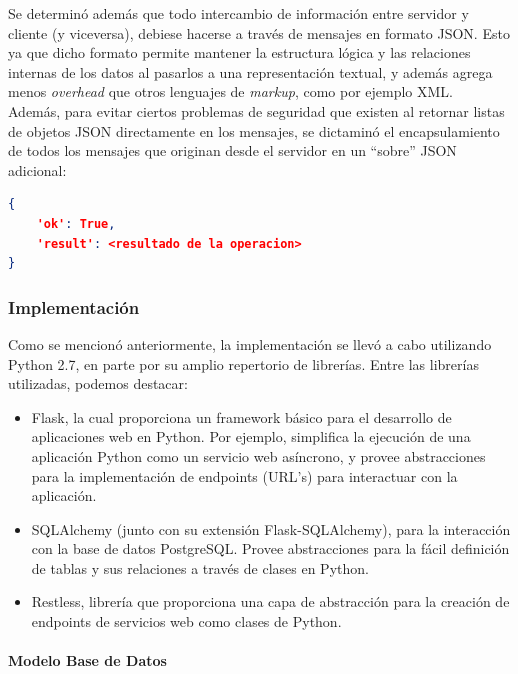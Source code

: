\documentclass[11pt,letterpaper]{article}
\begin{document}
Se determinó además que todo intercambio de información entre servidor y cliente (y viceversa), debiese hacerse a través de mensajes en formato JSON. Esto ya que dicho formato permite mantener la estructura lógica y las relaciones internas de los datos al pasarlos a una representación textual, y además agrega menos \emph{overhead} que otros lenguajes de \emph{markup}, como por ejemplo XML.\\

Además, para evitar ciertos problemas de seguridad que existen al retornar listas de objetos JSON directamente en los mensajes, se dictaminó el encapsulamiento de todos los mensajes que originan desde el servidor en un ``sobre'' JSON adicional:

\begin{lstlisting}[language=json, title=Ejemplo de ``sobre'' JSON.]
{
    'ok': True,
    'result': <resultado de la operacion>
}
\end{lstlisting}

\subsubsection{Implementación}

Como se mencionó anteriormente, la implementación se llevó a cabo utilizando Python 2.7, en parte por su amplio repertorio de librerías. Entre las librerías utilizadas, podemos destacar:
\begin{itemize}
    \item Flask\cite{flask}, la cual proporciona un framework básico para el desarrollo de aplicaciones web en Python. Por ejemplo, simplifica la ejecución de una aplicación Python como un servicio web asíncrono, y provee abstracciones para la implementación de endpoints (URL's) para interactuar con la aplicación.
    \item SQLAlchemy\cite{sqlalchemy} (junto con su extensión Flask-SQLAlchemy), para la interacción con la base de datos PostgreSQL. Provee abstracciones para la fácil definición de tablas y sus relaciones a través de clases en Python.
    \item Restless\cite{restless}, librería que proporciona una capa de abstracción para la creación de endpoints de servicios web como clases de Python.
\end{itemize}

\paragraph{Modelo Base de Datos\\\\}
\end{document}
